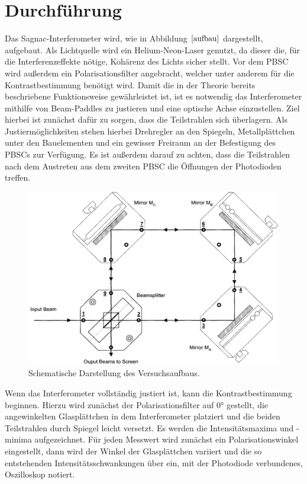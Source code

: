 \section{Durchführung}
Das Sagnac-Interferometer wird, wie in Abbildung $\ref{aufbau}$ dargestellt, aufgebaut. Als Lichtquelle wird ein Helium-Neon-Laser genutzt, da dieser die, für die Interferenzeffekte nötige, Kohärenz des Lichts sicher stellt.
Vor dem PBSC wird außerdem ein Polarisationsfilter angebracht, welcher unter anderem für die Kontrastbestimmung benötigt wird. Damit die in der Theorie bereits beschriebene Funktionsweise gewährleistet ist,
ist es notwendig das Interferometer mithilfe von Beam-Paddles zu justieren und eine optische Achse einzustellen. Ziel hierbei ist zunächst dafür zu sorgen, dass die Teilstrahlen sich überlagern. Als Justiermöglichkeiten
stehen hierbei Drehregler an den Spiegeln, Metallplättchen unter den Bauelementen und ein gewisser Freiraum an der Befestigung des PBSCs zur Verfügung. Es ist außerdem darauf zu achten, dass die Teilstrahlen
nach dem Austreten aus dem zweiten PBSC die Öffnungen der Photodioden treffen.
\begin{figure}[H]
  \centering
  \includegraphics[scale=0.4]{Bilder/skizze2.png}
  \caption{Schematische Darstellung des Versuchsaufbaus.\cite{anleitung}}
  \label{aufbau}
\end{figure}
Wenn das Interferometer vollständig justiert ist, kann die Kontrastbestimmung beginnen. Hierzu wird zunächst der Polarisationsfilter auf $0°$ gestellt, die angewinkelten Glasplättchen in dem Interferometer platziert
und die beiden Teilstrahlen durch Spiegel leicht versetzt.
Es werden die Intensitätsmaxima und -minima aufgezeichnet. Für jeden Messwert wird zunächst ein Polarisationswinkel eingestellt, dann wird der Winkel der Glasplättchen variiert und die so entstehenden
Intensitätsschwankungen über ein, mit der Photodiode verbundenes, Oszilloskop notiert.
